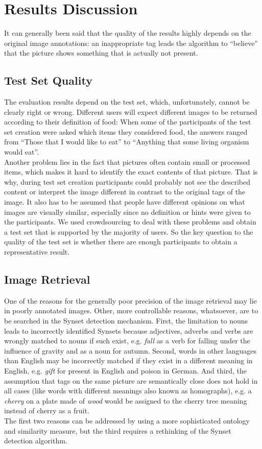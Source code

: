 %
\section{Results Discussion}
\label{sec_discussion}

It can generally been said that the quality of the results highly depends on the original image annotations: an inappropriate tag leads the algorithm to ``believe'' that the picture shows something that is actually not present.

\subsection{Test Set Quality}
The evaluation results depend on the test set, which, unfortunately, cannot be clearly right or wrong. Different users will expect different images to be returned according to their definition of food: When some of the participants of the test set creation were asked which items they considered food, the answers ranged from ``Those that I would like to eat'' to ``Anything that some living organism would eat''. \\
Another problem lies in the fact that pictures often contain small or processed items, which makes it hard to identify the exact contents of that picture. That is why, during test set creation participants could probably not see the described content or interpret the image different in contrast to the original tags of the image.
It also has to be assumed that people have different opinions on what images are visually similar, especially since no definition or hints were given to the participants. We used crowdsourcing to deal with these problems and obtain a test set that is supported by the majority of users. So the key question to the quality of the test set is whether there are enough participants to obtain a representative result.

\subsection{Image Retrieval}
One of the reasons for the generally poor precision of the image retrieval may lie in poorly annotated images.
Other, more controllable reasons, whatsoever, are to be searched in the Synset detection mechanism.
First, the limitation to nouns leads to incorrectly identified Synsets because adjectives, adverbs and verbs are wrongly matched to nouns if such exist, e.g. \emph{fall} as a verb for falling under the influence of gravity and as a noun for autumn.
Second, words in other languages than English may be incorrectly matched if they exist in a different meaning in English, e.g. \emph{gift} for present in English and poison in German.
And third, the assumption that tags on the same picture are semantically close does not hold in all cases (like words with different meanings also known as homographs), e.g. a \emph{cherry} on a plate made of \emph{wood} would be assigned to the cherry tree meaning instead of cherry as a fruit. \\
The first two reasons can be addressed by using a more sophisticated ontology and similarity measure, but the third requires a rethinking of the Synset detection algorithm.

